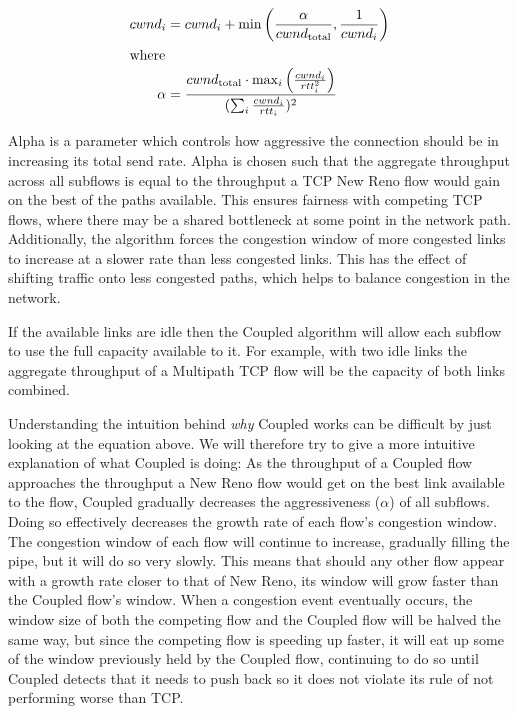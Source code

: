 \begin{align*}
  cwnd_i &= cwnd_i +
    \min\left(\frac{\alpha}{cwnd_\text{total}}, \frac{1}{cwnd_i}\right) \\
  \intertext{where}
  \alpha &=
    \frac{cwnd_\text{total} \cdot \max_i\left(\frac{cwnd_i}{rtt_i^2}\right)}
         {(\sum_i \frac{cwnd_i}{rtt_i})^2}
\end{align*}

Alpha is a parameter which controls how aggressive the connection should be in
increasing its total send rate. Alpha is chosen such that the aggregate
throughput across all subflows is equal to the throughput a TCP New Reno flow
would gain on the best of the paths available. This ensures fairness with
competing TCP flows, where there may be a shared bottleneck at some point in the
network path. Additionally, the algorithm forces the congestion window of more
congested links to increase at a slower rate than less congested links. This has
the effect of shifting traffic onto less congested paths, which helps to balance
congestion in the network.

If the available links are idle then the Coupled algorithm will allow each
subflow to use the full capacity available to it. For example, with two idle
links the aggregate throughput of a Multipath TCP flow will be the capacity of
both links combined.

Understanding the intuition behind \textit{why} Coupled works can be difficult
by just looking at the equation above. We will therefore try to give a more
intuitive explanation of what Coupled is doing: As the throughput of a Coupled
flow approaches the throughput a New Reno flow would get on the best link
available to the flow, Coupled gradually decreases the aggressiveness ($\alpha$)
of all subflows. Doing so effectively decreases the growth rate of each flow's
congestion window. The congestion window of each flow will continue to increase,
gradually filling the pipe, but it will do so very slowly. This means that
should any other flow appear with a growth rate closer to that of New Reno, its
window will grow faster than the Coupled flow's window. When a congestion event
eventually occurs, the window size of both the competing flow and the Coupled
flow will be halved the same way, but since the competing flow is speeding up
faster, it will eat up some of the window previously held by the Coupled flow,
continuing to do so until Coupled detects that it needs to push back so it
does not violate its rule of not performing worse than TCP.

